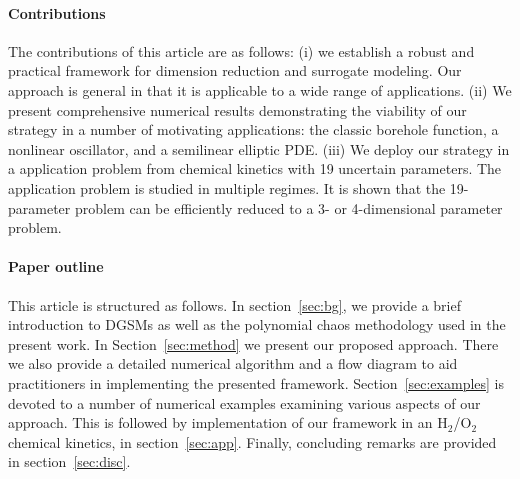 

\paragraph{Contributions}
The contributions of this article are as follows: (i) we establish a robust and
practical framework for dimension reduction and surrogate modeling.  Our
approach is general in that it is applicable to a wide range of applications.
(ii) We present comprehensive numerical results demonstrating the viability of
our strategy in a number of motivating applications: the classic borehole
function, a nonlinear oscillator, and a semilinear elliptic PDE.  (iii) We
deploy our strategy in a application problem from chemical kinetics with 19
uncertain parameters. The application problem is studied in multiple regimes.
It is shown that the 19-parameter problem can be efficiently reduced to a 3- 
or 4-dimensional parameter problem.

\paragraph{Paper outline}
This article is structured as follows. In section~\ref{sec:bg}, we provide a
brief introduction to DGSMs as well as the polynomial chaos methodology used in
the present work.  In Section~\ref{sec:method} we present our proposed
approach. There we also provide a detailed numerical algorithm and a flow
diagram to aid practitioners in implementing the presented framework.
Section~\ref{sec:examples} is devoted to a number of numerical examples
examining various aspects of our approach. This is followed by implementation
of our framework in an H$_2$/O$_2$ chemical kinetics, in section~\ref{sec:app}.
Finally, concluding remarks are provided in section~\ref{sec:disc}.






